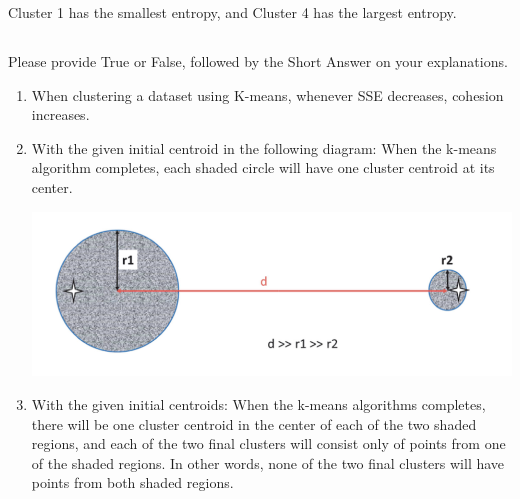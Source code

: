 \documentclass{article}
\begin{document}
Cluster 1 has the smallest entropy, and Cluster 4 has the largest entropy.

\subsection{}

Please provide True or False, followed by the Short Answer on your explanations.

\begin{enumerate}[label= (\alph*)]
    \item When clustering a dataset using K-means, whenever SSE decreases, cohesion increases.
    \item With the given initial centroid in the following diagram: When the k-means algorithm completes, each shaded circle will have one cluster centroid at its center.
    \begin{center}
        \includegraphics[scale=0.5]{images/Q2P3A.png}
    \end{center}
    \item With the given initial centroids: When the k-means algorithms completes, there will be one cluster centroid in the center of each of the two shaded regions, and each of the two final clusters will consist only of points from one of the shaded regions. In other words, none of the two final clusters will have points from both shaded regions.
    \begin{center}

\end{center}
\end{enumerate}
\end{document}
